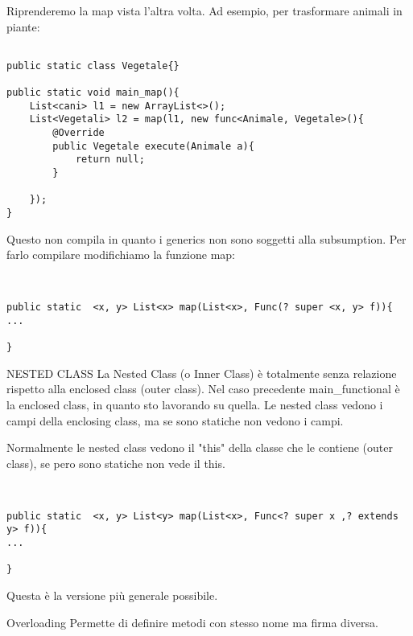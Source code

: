 Riprenderemo la map vista l'altra volta. Ad esempio, per trasformare animali in piante: 



\begin{lstlisting}[basicstyle=\small,]

public static class Vegetale{}

public static void main_map(){
	List<cani> l1 = new ArrayList<>();
	List<Vegetali> l2 = map(l1, new func<Animale, Vegetale>(){
		@Override
		public Vegetale execute(Animale a){
			return null;
		}
	
	});
}

\end{lstlisting}

Questo non compila in quanto i generics non sono soggetti alla subsumption. \newline
Per farlo compilare modifichiamo la funzione map: 


\begin{lstlisting}[basicstyle=\small,]


public static  <x, y> List<x> map(List<x>, Func(? super <x, y> f)){
...

}

\end{lstlisting}



NESTED CLASS \newline
La Nested Class (o Inner Class) è totalmente senza relazione rispetto alla enclosed class (outer class).\newline
Nel caso precedente main{\_}functional è la enclosed class, in quanto sto lavorando su quella. \newline
Le nested class vedono i campi della enclosing class, ma se sono statiche non vedono i campi. 


Normalmente le nested class vedono il "this" della classe che le contiene (outer class), se pero sono statiche non vede il this.

\begin{lstlisting}[basicstyle=\small,]


public static  <x, y> List<y> map(List<x>, Func<? super x ,? extends y> f)){
...

}

\end{lstlisting}
Questa è la versione più generale possibile. \newline

Overloading \newline
Permette di definire metodi con stesso nome ma firma diversa. 



